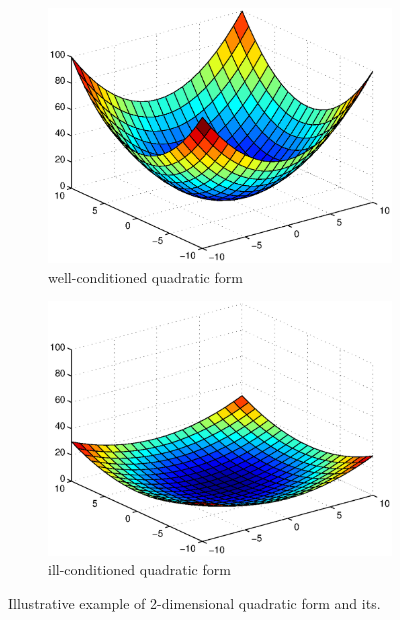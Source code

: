 \begin{figure}
\centering

\begin{subfigure}[b]{0.5\textwidth}
	\includegraphics[width=\textwidth]{fig/quadform1.eps}
	\caption{well-conditioned quadratic form}
	\label{fig:quad_form_well_conditioned}
\end{subfigure}%
\begin{subfigure}[b]{0.5\textwidth}
	\includegraphics[width=\textwidth]{fig/quadform2.eps}
	\caption{ill-conditioned quadratic form}
	\label{fig:quad_form_ill_conditioned}
\end{subfigure}

\caption{Illustrative example of 2-dimensional quadratic form and its.}
\label{fig:quad_form_conditionality}
\end{figure}


